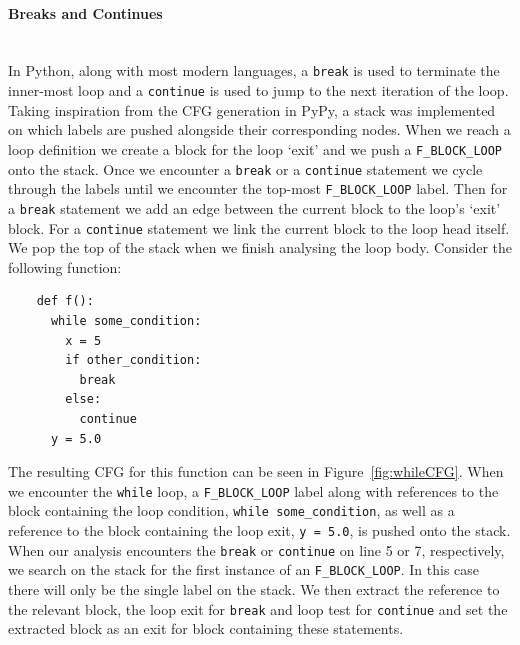 \documentclass[12pt, titlepage]{article}
\begin{document}
\paragraph*{Breaks and Continues} \mbox{} \\
In Python, along with most modern languages, a \texttt{break} is used to terminate the inner-most loop and a \texttt{continue} is used to jump to the next iteration of the loop. Taking inspiration from the CFG generation in PyPy, a stack was implemented on which labels are pushed alongside their corresponding nodes. When we reach a loop definition we create a block for the loop `exit' and we push a \texttt{F\_BLOCK\_LOOP} onto the stack. Once we encounter a \texttt{break} or a \texttt{continue} statement we cycle through the labels until we encounter the top-most \texttt{F\_BLOCK\_LOOP} label. Then for a \texttt{break} statement we add an edge between the current block to the loop's `exit' block. For a \texttt{continue} statement we link the current block to the loop head itself. We pop the top of the stack when we finish analysing the loop body. Consider the following function:
\begin{lstlisting}
    def f():
      while some_condition:
        x = 5
        if other_condition:
          break
        else:
          continue
      y = 5.0
\end{lstlisting}
The resulting CFG for this function can be seen in Figure~\ref{fig:whileCFG}. When we encounter the \texttt{while} loop, a \texttt{F\_BLOCK\_LOOP} label along with references to the block containing the loop condition, \texttt{while some\_condition}, as well as a reference to the block containing the loop exit, \texttt{y = 5.0}, is pushed onto the stack. When our analysis encounters the \texttt{break} or \texttt{continue} on line 5 or 7, respectively, we search on the stack for the first instance of an \texttt{F\_BLOCK\_LOOP}. In this case there will only be the single label on the stack. We then extract the reference to the relevant block, the loop exit for \texttt{break} and loop test for \texttt{continue} and set the extracted block as an exit for block containing these statements.
\end{document}
